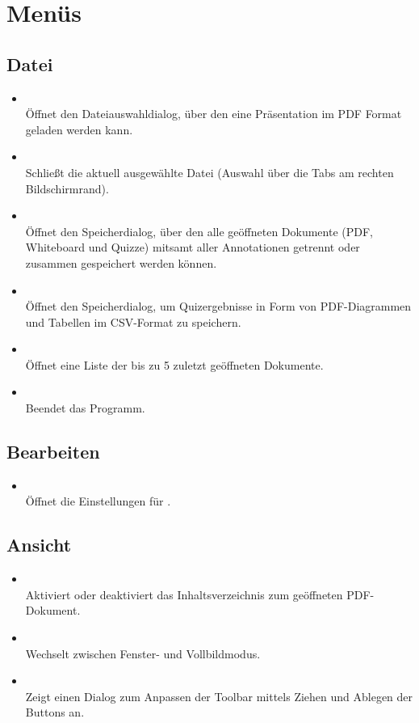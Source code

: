 \section{Menüs}
\subsection{Datei}
\begin{itemize}
\item {}\\Öffnet den Dateiauswahldialog, über den eine Präsentation im PDF Format geladen werden kann.
\item {}\\Schließt die aktuell ausgewählte Datei (Auswahl über die Tabs am rechten Bildschirmrand).
\item {}\\Öffnet den Speicherdialog, über den alle geöffneten Dokumente (PDF, Whiteboard und Quizze) mitsamt aller Annotationen getrennt oder zusammen gespeichert werden können.
\item {}\\Öffnet den Speicherdialog, um Quizergebnisse in Form von PDF-Diagrammen und Tabellen im CSV-Format zu speichern.
\item {}\\Öffnet eine Liste der bis zu 5 zuletzt geöffneten Dokumente.
\item {}\\Beendet das Programm.
\end{itemize}
\subsection{Bearbeiten}
\begin{itemize}
\item {}\\Öffnet die Einstellungen für \lectPresenter{}.
\end{itemize}
\subsection{Ansicht}
\begin{itemize}
\item {}\\Aktiviert oder deaktiviert das Inhaltsverzeichnis zum geöffneten PDF-Dokument.
\item {}\\Wechselt zwischen Fenster- und Vollbildmodus.
\item {}\\Zeigt einen Dialog zum Anpassen der Toolbar mittels Ziehen und Ablegen der Buttons an.
\end{itemize}
